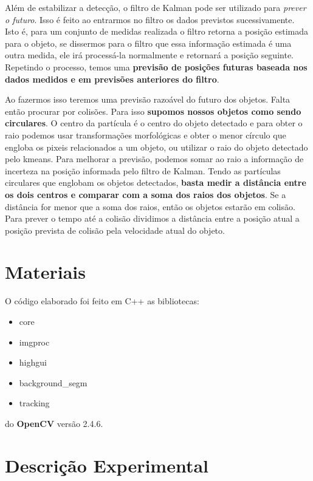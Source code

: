 \documentclass[journal]{IEEEtran}
\begin{document}
Além de estabilizar a detecção, o filtro de Kalman pode ser utilizado 
para \textit{prever o futuro}. Isso é feito ao entrarmos no filtro os 
dados previstos sucessivamente. Isto é, para um conjunto de medidas 
realizada o filtro retorna a posição estimada para o objeto, se 
dissermos para o filtro que essa informação estimada é uma outra 
medida, ele irá processá-la normalmente e retornará a posição 
seguinte. Repetindo o processo, temos uma \textbf{previsão de 
posições 
futuras baseada nos dados medidos e em previsões anteriores do 
filtro}.

Ao fazermos isso teremos uma previsão razoável do futuro dos objetos. 
Falta então procurar por colisões. Para isso \textbf{supomos nossos 
objetos 
como sendo circulares}. O centro da partícula é o centro do objeto 
detectado e para obter o raio podemos usar transformações 
morfológicas e obter o menor círculo que engloba os pixeis 
relacionados a um objeto, ou utilizar o raio do objeto detectado pelo 
kmeans. Para melhorar a previsão, podemos somar ao raio a informação 
de incerteza na posição informada pelo filtro de Kalman. Tendo as 
partículas circulares que englobam os objetos detectados, 
\textbf{basta medir 
a distância entre os dois centros e comparar com a soma dos raios dos 
objetos}. Se a distância for menor que a soma dos raios, então os 
objetos estarão em colisão. Para prever o tempo até a colisão 
dividimos
a distância entre a posição atual a posição prevista de colisão pela
velocidade atual do objeto.




\section{Materiais}
O código elaborado foi feito em C++ as bibliotecas:
\begin{itemize}
    \item core
    \item imgproc
    \item highgui
    \item background\_segm
    \item tracking
\end{itemize}
do \textbf{OpenCV} versão 2.4.6.
\section{Descrição Experimental}
\end{document}
